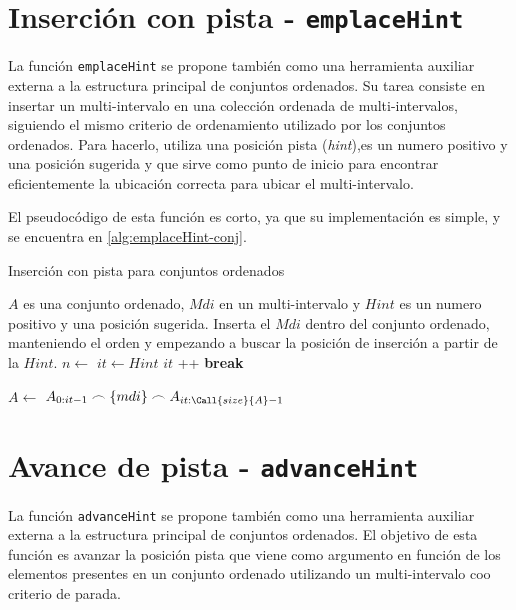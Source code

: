 \section*{Inserción con pista - \texttt{emplaceHint}}

La función \texttt{emplaceHint} se propone también como una herramienta auxiliar externa a la estructura principal de conjuntos ordenados. Su tarea consiste en insertar un multi-intervalo en una colección ordenada de multi-intervalos, siguiendo el mismo criterio de ordenamiento utilizado por los conjuntos ordenados. Para hacerlo, utiliza una posición pista (\textit{hint}),es un numero positivo y una posición sugerida y que sirve como punto de inicio para encontrar eficientemente la ubicación correcta para ubicar el multi-intervalo.

El pseudocódigo de esta función es corto, ya que su implementación es simple, y se encuentra en \ref{alg:emplaceHint-conj}.

\begin{algorithm}
\caption{Inserción con pista para conjuntos ordenados}
\label{alg:emplaceHint-conj}
\begin{algorithmic}[1]
\Require $A$ es una conjunto ordenado, $Mdi$ en un multi-intervalo y $Hint$ es un numero positivo y una posición sugerida.
\Ensure Inserta el $Mdi$ dentro del conjunto ordenado, manteniendo el orden y empezando a buscar la posición de inserción a partir de la $Hint$.
     \State $n \gets$ 
    \State $it \gets Hint$ 
            \State $it$ \!+\!+
        \Else
            \State \textbf{break}
        \EndIf
    \EndWhile

      \State $A \gets$ $A_{0:it-1} \frown \{mdi\} \frown A_{it:\Call{size}{A}-1}$
\EndFunction
\end{algorithmic}
\end{algorithm}


\section*{Avance de pista - \texttt{advanceHint}}

La función \texttt{advanceHint} se propone también como una herramienta auxiliar externa a la estructura principal de conjuntos ordenados. El objetivo de esta función es avanzar la posición pista que viene como argumento en función de los elementos presentes en un conjunto ordenado utilizando un multi-intervalo coo criterio de parada.

